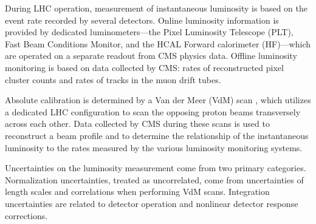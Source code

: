During LHC operation, measurement of instantaneous luminosity is based on the event rate recorded by several detectors. Online luminosity information is provided by dedicated luminometers---the Pixel Luminosity Telescope (PLT), Fast Beam Conditions Monitor, and the HCAL Forward calorimeter (HF)---which are operated on a separate readout from CMS physics data. Offline luminosity monitoring is based on data collected by CMS: rates of reconstructed pixel cluster counts and rates of tracks in the muon drift tubes\cite{Lujan:2647819}.

Absolute calibration is determined by a Van der Meer (VdM) scan \cite{vanderMeer:1968zz}\cite{Balagura:2011yw}, which utilizes a dedicated LHC configuration to scan the opposing proton beams transversely across each other. Data collected by CMS during these scans is used to reconstruct a beam profile and to determine the relationship of the instantaneous luminosity to the rates measured by the various luminosity monitoring systems.

Uncertainties on the luminosity measurement come from two primary categories. Normalization uncertainties, treated as uncorrelated, come from uncertainties of length scales and correlations when performing VdM scans. Integration uncertainties are related to detector operation and nonlinear detector response corrections\cite{CMS:2018elu}.
